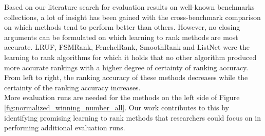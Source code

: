 \documentclass{sig-alternate}
\begin{document}
Based on our literature search for evaluation results on well-known benchmarks collections, a lot of insight has been gained with the cross-benchmark comparison on which methods tend to perform better than others. However, no closing arguments can be formulated on which learning to rank methods are most accurate. LRUF, FSMRank, FenchelRank, SmoothRank and ListNet were the learning to rank algorithms for which it holds that no other algorithm produced more accurate rankings with a higher degree of certainty of ranking accuracy. From left to right, the ranking accuracy of these methods decreases while the certainty of the ranking accuracy increases.\\

More evaluation runs are needed for the methods on the left side of Figure \ref{fig:normalized_winning_number_all}. Our work contributes to this by identifying promising learning to rank methods that researchers could focus on in performing additional evaluation runs.
%
\balance

{\scriptsize}
\onecolumn
%
%
\appendix
\end{document}
